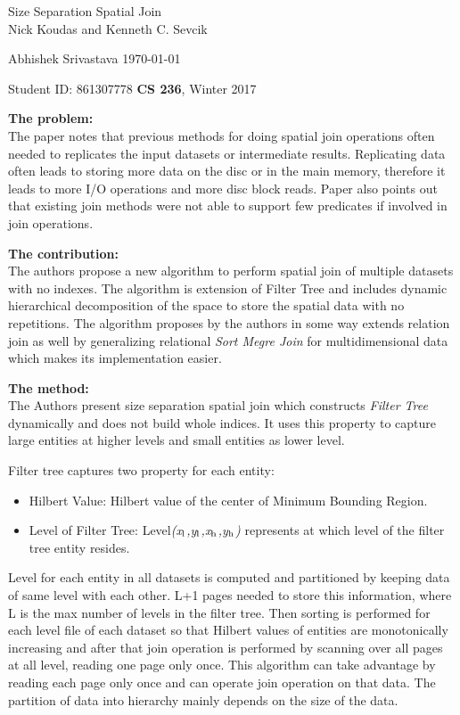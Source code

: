 \documentclass[a4paper,12pt, twoside]{article}
\renewcommand{\maketitle}{%
 	\Large
 	\begin{center}
 	Size Separation Spatial Join \\	
 	\normalsize Nick Koudas and Kenneth C. Sevcik
 	\end{center}
 
 	\Large
	Abhishek Srivastava
	\hfill
	\normalsize
	\today
 	\par
 	Student ID: 861307778
 	\hfill
 	\textbf{CS 236}, Winter 2017
 	\par 	
 	\hrulefill
 	\par
 	}
\begin{document}
\thispagestyle{empty}
	
\maketitle

\textbf{The problem:}\\
The paper notes that previous methods for doing spatial join operations often needed to replicates the input datasets or intermediate results. Replicating data often leads to storing more data on the disc or in the main memory, therefore it leads to more I/O operations and more disc block reads. Paper also points out that existing join methods were not able to support few predicates if involved in join operations.  

\textbf{The contribution:}\\
The authors propose a new algorithm to perform spatial join of multiple datasets with no indexes. The algorithm is extension of Filter Tree and includes dynamic hierarchical decomposition of the space to store the spatial data with no repetitions. The algorithm proposes by the authors in some way extends relation join as well by generalizing relational \emph{Sort Megre Join} for multidimensional data which makes its implementation easier.

\textbf{The method:}\\
The Authors present size separation spatial join which constructs \emph{Filter Tree} dynamically and does not build whole indices. It uses this property to capture large entities at higher levels and small entities as lower level.

Filter tree captures two property for each entity: 
\begin{itemize}
	\item Hilbert Value:  Hilbert value of the center of Minimum Bounding Region.
	\item Level of Filter Tree: Level\emph{(x$_\textrm{\scriptsize l}$,y$_\textrm{\scriptsize l}$,x$_\textrm{\scriptsize h}$,y$_\textrm{\scriptsize h}$) }represents at which level of the filter tree entity resides.
\end{itemize}

Level for each entity in all datasets is computed and partitioned by keeping data of same level with each other. L+1 pages needed to store this information, where L is the max number of levels in the filter tree. Then sorting is performed for each level file of each dataset so that Hilbert values of entities are monotonically increasing and after that join operation is performed by scanning over all pages at all level, reading one page only once. This algorithm can take advantage by reading each page only once and can operate join operation on that data. The partition of data into hierarchy mainly depends on the size of the data.
\end{document}
